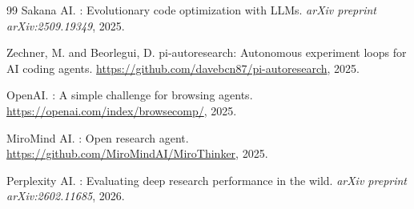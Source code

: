 \documentclass[11pt,a4paper]{article}
\begin{document}
\begin{thebibliography}{99}
Sakana AI.
: Evolutionary code optimization with {LLMs}.
\newblock \emph{arXiv preprint arXiv:2509.19349}, 2025.

Zechner, M. and Beorlegui, D.
\newblock pi-autoresearch: Autonomous experiment loops for {AI} coding agents.
\newblock \url{https://github.com/davebcn87/pi-autoresearch}, 2025.

OpenAI.
: A simple challenge for browsing agents.
\newblock \url{https://openai.com/index/browsecomp/}, 2025.

MiroMind AI.
: Open research agent.
\newblock \url{https://github.com/MiroMindAI/MiroThinker}, 2025.

Perplexity AI.
: Evaluating deep research performance in the wild.
\newblock \emph{arXiv preprint arXiv:2602.11685}, 2026.

\end{thebibliography}
\end{document}
